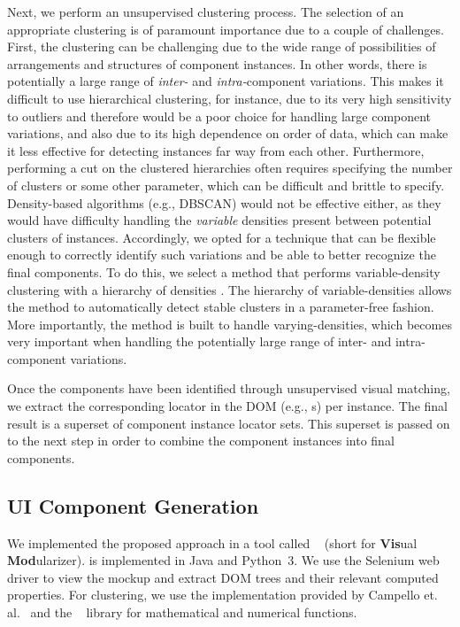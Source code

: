 Next, we perform an unsupervised clustering process. The selection of an appropriate clustering is of paramount importance due to a couple of challenges. First, the clustering can be challenging due to the wide range of possibilities of arrangements and structures of component instances. In other words, there is potentially a large range of \emph{inter-} and \emph{intra-}component variations. 
This makes it difficult to use hierarchical clustering, for instance, due to its very high sensitivity to outliers and therefore would be a poor choice for handling large component variations, and also due to its high dependence on order of data, which can make it less effective for detecting instances far way from each other. Furthermore, performing a cut on the clustered hierarchies often requires specifying the number of clusters or some other parameter, which can be difficult and brittle to specify. Density-based algorithms (e.g., DBSCAN) would not be effective either, as they would have difficulty handling the \emph{variable} densities present between potential clusters of instances. Accordingly, we opted for a technique that can be flexible enough to correctly identify such variations and be able to better recognize the final components. To do this, we select a method that performs variable-density clustering with a hierarchy of densities \cite{campello2013density}. The hierarchy of variable-densities allows the method to automatically detect stable clusters in a parameter-free fashion. More importantly, the method is built to handle varying-densities, which becomes very important when handling the potentially large range of inter- and intra-component variations.
 
Once the components have been identified through unsupervised visual matching,
we extract the corresponding locator in the DOM (e.g., {\xpath}s) per instance.
The final result is a superset of component instance locator sets.
This superset is passed on to the next step in order to combine the component instances into final components.


\subsection{UI Component Generation}
\label{sec:ui-comp-gen}


\label{section:implementation}

We implemented the proposed approach in a tool called \toolname~\cite{tool-and-data} (short for \textbf{Vis}ual \textbf{Mod}ularizer). 
\toolname is implemented in Java and Python~3. We use the Selenium web driver to view the mockup and extract DOM trees and their relevant computed properties. 
For clustering, we use the implementation provided by Campello et. al.~\cite{campello2013density} 
and the ~\cite{walt2011numpy} library for mathematical and numerical functions. 




 
